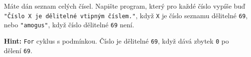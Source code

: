 \question[50]
Máte dán seznam celých čísel. Napište program, který pro každé číslo vypíše buď
\texttt{"Číslo X je
	dělitelné vtipným číslem."}, když \texttt{X} je číslo
seznamu dělitelné
\texttt{69}, nebo \texttt{"amogus"}, když číslo dělitelné
\texttt{69} není.

\textbf{Hint:} \texttt{For} cyklus s podmínkou. Číslo je dělitelné \texttt{69},
když dává zbytek \texttt{0} po dělení \texttt{69}.